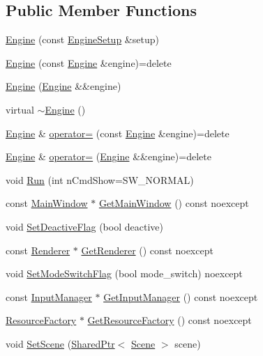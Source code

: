 \subsection*{Public Member Functions}
\begin{DoxyCompactItemize}
\item 
\hyperlink{classmage_1_1_engine_a99770cbb017b29c284d7f8e4c7e2b84c}{Engine} (const \hyperlink{structmage_1_1_engine_setup}{Engine\+Setup} \&setup)
\item 
\hyperlink{classmage_1_1_engine_afd2f4f32b2e803f59521aafe1924f0ba}{Engine} (const \hyperlink{classmage_1_1_engine}{Engine} \&engine)=delete
\item 
\hyperlink{classmage_1_1_engine_a69ee5a698bf54da107ebaa7839812840}{Engine} (\hyperlink{classmage_1_1_engine}{Engine} \&\&engine)
\item 
virtual \hyperlink{classmage_1_1_engine_a34628556f8397d70ed018d71e343c2f5}{$\sim$\+Engine} ()
\item 
\hyperlink{classmage_1_1_engine}{Engine} \& \hyperlink{classmage_1_1_engine_a1eedff82d4c8207c61676230520648fd}{operator=} (const \hyperlink{classmage_1_1_engine}{Engine} \&engine)=delete
\item 
\hyperlink{classmage_1_1_engine}{Engine} \& \hyperlink{classmage_1_1_engine_a22607a263e0be5e179cc0e4bf13b18f7}{operator=} (\hyperlink{classmage_1_1_engine}{Engine} \&\&engine)=delete
\item 
void \hyperlink{classmage_1_1_engine_a246c82d0e55bc29e73aecbc365464ec8}{Run} (int n\+Cmd\+Show=S\+W\+\_\+\+N\+O\+R\+M\+AL)
\item 
const \hyperlink{classmage_1_1_main_window}{Main\+Window} $\ast$ \hyperlink{classmage_1_1_engine_ae12773fc604a46a3d94222ebcae2d593}{Get\+Main\+Window} () const noexcept
\item 
void \hyperlink{classmage_1_1_engine_a942bfa9892fa79bb1068d7c7ec4e6732}{Set\+Deactive\+Flag} (bool deactive)
\item 
const \hyperlink{classmage_1_1_renderer}{Renderer} $\ast$ \hyperlink{classmage_1_1_engine_a91f77d4f1914e1d63d405444a590615b}{Get\+Renderer} () const noexcept
\item 
void \hyperlink{classmage_1_1_engine_a5609c1700971f83bcf5b3259f7fea604}{Set\+Mode\+Switch\+Flag} (bool mode\+\_\+switch) noexcept
\item 
const \hyperlink{classmage_1_1_input_manager}{Input\+Manager} $\ast$ \hyperlink{classmage_1_1_engine_a9e8de859024c2b51d9b20ce498d6c07b}{Get\+Input\+Manager} () const noexcept
\item 
\hyperlink{classmage_1_1_resource_factory}{Resource\+Factory} $\ast$ \hyperlink{classmage_1_1_engine_a891f26e1a3e9a0113b9c4d337c82a04e}{Get\+Resource\+Factory} () const noexcept
\item 
void \hyperlink{classmage_1_1_engine_aec75ed67f8fb68a383fa892e50b21ea7}{Set\+Scene} (\hyperlink{namespacemage_a1e01ae66713838a7a67d30e44c67703e}{Shared\+Ptr}$<$ \hyperlink{classmage_1_1_scene}{Scene} $>$ scene)
\end{DoxyCompactItemize}
